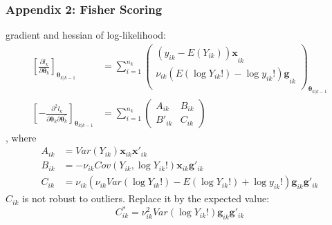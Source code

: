 \documentclass{beamer}
\begin{document}
	\begin{frame}
		\frametitle{Appendix 2: Fisher Scoring}
		gradient and hessian of log-likelihood:
		\begin{align*}
			\left\lbrack \frac{\partial l_{k}}{\partial\bm{\theta}_{k}} \right\rbrack_{\bm{\theta}_{k|k - 1}} &= \sum_{i = 1}^{n_{k}}\begin{pmatrix}
				{\left( y_{ik} - E\left( Y_{ik} \right) \right)\bm{x}}_{ik} \\
				{\nu_{ik}\left( E\left( \log{Y_{ik}!} \right) - \log{y_{ik}!} \right)\bm{g}}_{ik} \\
			\end{pmatrix}_{\bm{\theta}_{k|k - 1}}\\
		\left\lbrack - \frac{\partial^{2}l_{k}}{\partial\mathbf{\theta}_{k}\partial\mathbf{\theta}_{k}^{\mathbf{'}}} \right\rbrack_{\mathbf{\theta}_{k|k - 1}} &= \sum_{i = 1}^{n_{k}}\begin{pmatrix}
			A_{ik} & B_{ik}\\
			B'_{ik} & C_{ik}
		\end{pmatrix}
		\end{align*}
		, where
		\begin{align*}
			A_{ik} &= Var(Y_{ik})\bm{x}_{ik}\bm{x}'_{ik}\\
			B_{ik} &= -\nu_{ik}Cov(Y_{ik}, \log Y_{ik}!)\bm{x}_{ik}\bm{g}'_{ik}\\
			C_{ik} &= \nu_{ik}(\nu_{ik}Var(\log Y_{ik}!) - E(\log Y_{ik}!) + \log  y_{ik}!)\bm{g}_{ik}\bm{g}'_{ik}
		\end{align*}
	$C_{ik}$ is not robust to outliers. Replace it by the expected value:	
	$$C_{ik}^* = \nu^2_{ik}Var(\log Y_{ik}!)\bm{g}_{ik}\bm{g}'_{ik}$$
	\end{frame}
	
\end{document}

